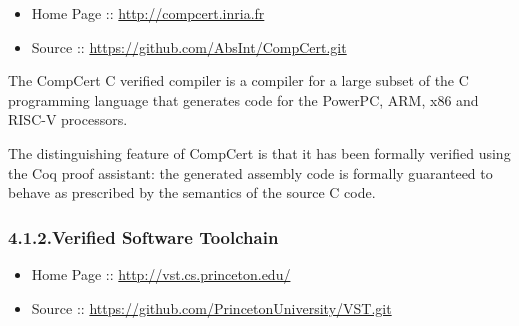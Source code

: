 \documentclass[12pt,twoside]{article}
\begin{document}
\begin{itemize}[noitemsep,topsep=\mdcompacttopsep]%

\item{}Home Page :: \href{http://compcert.inria.fr}{{\ttfamily http://\hspace{0pt}compcert.\hspace{0pt}inria.\hspace{0pt}fr}}%

\item{}Source :: \href{https://github.com/AbsInt/CompCert.git}{{\ttfamily https://\hspace{0pt}github.\hspace{0pt}com/\hspace{0pt}AbsInt/\hspace{0pt}CompCert.\hspace{0pt}git}}%
\end{itemize}%

\noindent{}The CompCert C verified compiler is a compiler for a large subset of
the C programming language that generates code for the PowerPC, ARM,
x86 and RISC-V processors.%

The distinguishing feature of CompCert is that it has been formally
verified using the Coq proof assistant: the generated assembly code is
formally guaranteed to behave as prescribed by the semantics of the
source C code.%

\subsubsection{4.1.2.\hspace*{0.5em}Verified Software Toolchain}\label{sec-verified-software-toolchain}%

\begin{itemize}[noitemsep,topsep=\mdcompacttopsep]%

\item{}Home Page :: \href{http://vst.cs.princeton.edu/}{{\ttfamily http://\hspace{0pt}vst.\hspace{0pt}cs.\hspace{0pt}princeton.\hspace{0pt}edu/\hspace{0pt}}}%

\item{}Source :: \href{https://github.com/PrincetonUniversity/VST.git}{{\ttfamily https://\hspace{0pt}github.\hspace{0pt}com/\hspace{0pt}PrincetonUniversity/\hspace{0pt}VST.\hspace{0pt}git}}%
\end{itemize}%
\end{document}
